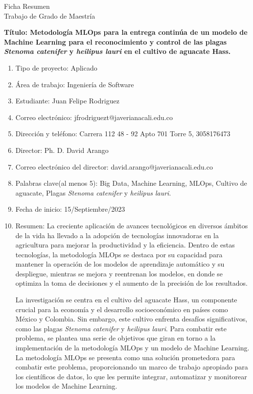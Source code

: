 \thispagestyle{empty}
\begin{center}
    \Large{Ficha Resumen \\ Trabajo de Grado de Maestría}
\end{center}

\textbf{Título: Metodología MLOps para la entrega continúa de un modelo de Machine Learning para el reconocimiento y control de las plagas \textit{Stenoma catenifer} y \textit{heilipus lauri} en el cultivo de aguacate Hass.}
\begin{enumerate}
    \item Tipo de proyecto: Aplicado
    \item Área de trabajo: Ingeniería de Software
    \item Estudiante: Juan Felipe Rodriguez
    \item Correo electrónico: jfrodriguezt@javerianacali.edu.co
    \item Dirección y teléfono: Carrera 112 48 - 92 Apto 701 Torre 5, 3058176473
    \item Director: Ph. D. David Arango
    \item Correo electrónico del director: david.arango@javerianacali.edu.co
    \item Palabras clave(al menos 5): Big Data, Machine Learning, MLOps, Cultivo de aguacate, Plagas \textit{Stenoma catenifer} y \textit{heilipus lauri}.
    \item Fecha de inicio: 15/Septiembre/2023
    \item Resumen: La creciente aplicación de avances tecnológicos en diversos ámbitos de la vida ha llevado a la adopción de tecnologías innovadoras en la agricultura para mejorar la productividad y la eficiencia. Dentro de estas tecnologías, la metodología MLOps se destaca por su capacidad para mantener la operación de los modelos de aprendizaje automático y su despliegue, mientras se mejora y reentrenan los modelos, en donde se optimiza la toma de decisiones y el aumento de la precisión de los resultados.
\newpage
\thispagestyle{empty}

    La investigación se centra en el cultivo del aguacate Hass, un componente crucial para la economía y el desarrollo socioeconómico en países como México y Colombia. Sin embargo, este cultivo enfrenta desafíos significativos, como las plagas \textit{Stenoma catenifer} y \textit{heilipus lauri}. Para combatir este problema, se plantea una serie de objetivos que giran en torno a la implementación de la metodología MLOps y un modelo de Machine Learning. La metodología MLOps se presenta como una solución prometedora para combatir este problema, proporcionando un marco de trabajo apropiado para los científicos de datos, lo que les permite integrar, automatizar y monitorear los modelos de Machine Learning.


\end{enumerate}
